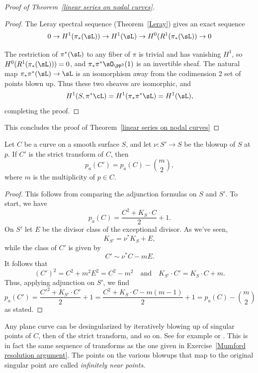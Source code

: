 \begin{proof}[Proof of Theorem~\ref{linear series on nodal curves}]
\begin{proof}
The Leray spectral sequence (Theorem~\ref{Leray}) gives an exact sequence
$$
0\to H^{1}(\pi_{*}(\sL)) \to H^{1}(\sL) \to  H^{0}(R^{1}(\pi_{*}(\sL))\to 0
$$

 The restriction of $\pi^{*}(\sL)$ to any fiber of $\pi$ is trivial and has vanishing $H^{1}$,
so
$H^{0}(R^{1}(\pi_{*}(\sL))) = 0$, and $\pi_{*}\pi^{*}\sO_{\PP^{2}}(1)$ is an invertible sheaf.
The natural map
$\pi_{*}\pi^{*}(\sL) \to \sL$ is an isomorphism away from the codimension
2 set of points blown up. Thus these two sheaves are isomorphic, and
$$
H^1(S, \pi^*\cL) = H^{1}(\pi_{*}\pi^{*}\sL) = H^{1}(\sL),
$$
completing the proof.
\end{proof}

This concludes the proof of Theorem~\ref{linear series on nodal curves}
\end{proof}



\begin{proposition}\label{effect of blowup on genus}
 Let $C$ be a curve on a smooth surface $S$, and let $\nu : S' \to S$ be the blowup of $S$ at $p$. If $C'$ is the strict transform of $C$, then
 $$
 p_a(C') = p_a(C) -{m\choose 2},
 $$
 where $m$ is the multiplicity of $p\in C$.
\end{proposition}
\begin{proof}
This follows from comparing the adjunction formulas on $S$ and $S'$. To start, we have
$$
p_a(C) = \frac{C^2 + K_S\cdot C}{2} + 1.
$$
On $S'$ let $E$ be the divisor class of the exceptional divisor. As we've seen,
$$
K_{S'} = \nu^*K_S + E,
$$
while the class of $C'$ is given by
$$
C' \sim \nu^*C - mE.
$$
It follows that
$$
(C')^2 = C^2 + m^2E^2 = C^2 - m^2 \quad \text{and} \quad K_{S'}\cdot C' = K_S\cdot C + m.
$$
Thus, applying adjunction on $S'$, we find
$$
p_a(C') = \frac{{C'}^2 + K_{S'}\cdot C'}{2} + 1 = \frac{C^2 + K_S\cdot C - m(m-1)}{2} + 1 = p_a(C) -{m\choose 2}
$$
as stated.
\end{proof}

\begin{fact}
Any plane curve can be desingularized by
iteratively blowing up of singular points of $C$, then of the strict transform, and so on. See for example
\cite{Fulton1989} or \cite{Brieskorn1986}.  This is in fact the same
sequence of transforms as the one given in Exercise~\ref{Mumford resolution argument}. 
The points on the various blowups that
map to the original singular point are called \emph{infinitely near points}.
\end{fact}

